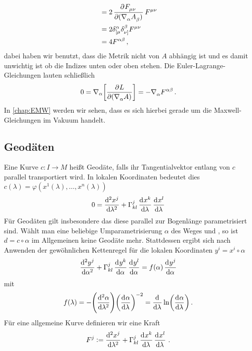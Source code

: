 \begin{beispiel}
\begin{equation}
\begin{split}
&=2\dpd{\tensor{F}{_\mu_\nu}}{(\tensor{\nabla}{_\alpha}\tensor{A}{_\beta})}\tensor{F}{^\mu^\nu}\\
&=2\tensor*{\delta}{^\alpha_[_\mu}\tensor*{\delta}{^\beta_\nu_]}\tensor{F}{^\mu^\nu}\\
&=4\tensor{F}{^\alpha^\beta}\,,
\end{split}
\end{equation}
dabei haben wir benutzt, dass die Metrik nicht von $A$ abhängig ist und es damit
unwichtig ist ob die Indizes unten oder oben stehen.
Die Euler-Lagrange-Gleichungen lauten schließlich
\begin{equation}
0=\nabla_\alpha\left[\dpd{L}{\left(\tensor{\nabla}{_\alpha}A\right)}\right]
=-\tensor{\nabla}{_\alpha}\tensor{F}{^\alpha^\beta}\,.
\end{equation}
In \autoref{chap:EMW} werden wir sehen, dass es sich hierbei gerade um die
Maxwell-Gleichungen im Vakuum handelt.
\end{beispiel}
\subsection{Geodäten}
Eine Kurve $c:I\to M$ heißt Geodäte, falls ihr Tangentialvektor entlang von 
$c$ parallel transportiert wird. In lokalen Koordinaten bedeutet dies 
$c(\lambda)=\varphi(x^1(\lambda),\dots, x^n(\lambda))$ 
\begin{equation}
0=\dod[2]{x^j}{\lambda}+\Gamma^{j}_{kl}\dod{x^k}{\lambda}\dod{x^l}{\lambda}
\end{equation}
Für Geodäten gilt insbesondere das diese parallel zur Bogenlänge parametrisiert
sind. Wählt man eine beliebige Umparametrisierung  $\alpha$ des Weges 
und , so ist $d=c\circ \alpha$ im Allgemeinen keine
Geodäte mehr. Stattdessen ergibt sich nach Anwenden der gewöhnlichen Kettenregel
für die lokalen Koordinaten $y^i=x^i\circ\alpha$
\begin{equation}
\dod[2]{y^j}{\alpha}+\Gamma^{j}_{kl}\dod{y^k}{\alpha}\dod{y^l}{\alpha}
=f(\alpha)\dod{y^j}{\alpha}
\end{equation}
mit 
\begin{equation}
f(\lambda)
 =-\left(\dod[2]{\alpha}{\lambda}\right)\left(\dod{\alpha}{\lambda}\right)^{-2}
 =\dod{}{\lambda}\ln\left(\dod{\alpha}{\lambda}\right)\,.
\end{equation}
Für eine allgemeine Kurve definieren wir eine Kraft
\begin{equation}
F^j:=\dod[2]{x^j}{\lambda}+\Gamma^{j}_{kl}\dod{x^k}{\lambda}\dod{x^l}{\lambda}\,.
\end{equation}

